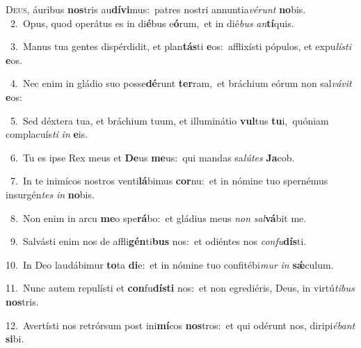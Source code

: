 \lettrine{\initial\textcolor{\initialcolor}{D}}{eus,} áuribus \textbf{nos}\-tris au\-\textbf{dí}\-\textbf{vi}mus:~\star patres nostri annuntia\-\textit{vé}\-\textit{runt} \textbf{no}\-bis.\\
{\numbfont\textcolor{\numbcolor}{~2.}}~Opus, quod operátus es in di\-\textbf{é}\-bus e\-\textbf{ó}\-rum,~\star et in dié\textit{bus} \textit{an}\-\textbf{tí}quis.\par
{\numbfont\textcolor{\numbcolor}{~3.}}~Manus tua gentes dispérdidit, et plan\-\textbf{tás}\-ti \textbf{e}\-os:~\star afflixísti pópulos, et expu\-\textit{lís}\-\textit{ti} \textbf{e}\-os.\par
{\numbfont\textcolor{\numbcolor}{~4.}}~Nec enim in gládio suo posse\-\textbf{dé}\-runt \textbf{ter}\-ram,~\star et bráchium eórum non sal\-\textit{vá}\-\textit{vit} \textbf{e}\-os:\par
{\numbfont\textcolor{\numbcolor}{~5.}}~Sed déxtera tua, et bráchium tuum, et illuminátio \textbf{vul}\-tus \textbf{tu}\-i,~\star quóniam complacuís\textit{ti} \textit{in} \textbf{e}\-is.\par
{\numbfont\textcolor{\numbcolor}{~6.}}~Tu es ipse Rex meus et \textbf{De}\-us \textbf{me}\-us:~\star qui mandas sa\-\textit{lú}\-\textit{tes} \textbf{Ja}\-cob.\par
{\numbfont\textcolor{\numbcolor}{~7.}}~In te inimícos nostros venti\-\textbf{lá}\-bimus \textbf{cor}\-nu:~\star et in nómine tuo spernémus insurgén\textit{tes} \textit{in} \textbf{no}\-bis.\par
{\numbfont\textcolor{\numbcolor}{~8.}}~Non enim in arcu \textbf{me}\-o spe\-\textbf{rá}\-bo:~\star et gládius meus \textit{non} \textit{sal}\-\textbf{vá}bit me.\par
{\numbfont\textcolor{\numbcolor}{~9.}}~Salvásti enim nos de affli\-\textbf{gén}\-ti\textbf{bus} nos:~\star et odiéntes nos \textit{con}\-\textit{fu}\textbf{dís}ti.\par
{\numbfont\textcolor{\numbcolor}{10.}}~In Deo laudábimur \textbf{to}\-ta \textbf{di}\-e:~\star et in nómine tuo confitébi\textit{mur} \textit{in} \textbf{sǽ}\-culum.\par
{\numbfont\textcolor{\numbcolor}{11.}}~Nunc autem repulísti et \textbf{con}\-fu\-\textbf{dís}\-\textbf{ti} nos:~\star et non egrediéris, Deus, in virtú\-\textit{ti}\-\textit{bus} \textbf{nos}\-tris.\par
{\numbfont\textcolor{\numbcolor}{12.}}~Avertísti nos retrórsum post ini\-\textbf{mí}\-cos \textbf{nos}\-tros:~\star et qui odérunt nos, diripi\-\textit{é}\-\textit{bant} \textbf{si}\-bi.\par
